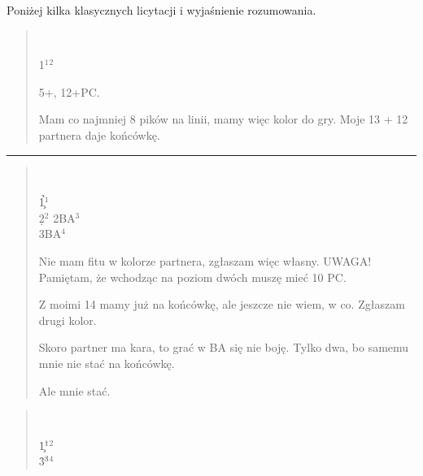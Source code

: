 \documentclass{article}
\begin{document}
Poniżej kilka klasycznych licytacji i wyjaśnienie rozumowania.
\newpage
\begin{multicols}{2}
\begin{quote}
%
           {}{}\\
\begin{pbidding}
1\s$^1$\s$^2$\\
\end{pbidding}
\begin{description}[before={\renewcommand\makelabel[1]{\bfseries ##1)}}]
	\item[1] 5+\s, 12+PC.
	\item[2] Mam co najmniej 8 pików na linii, mamy więc kolor do gry. Moje 13 + 12 partnera daje końcówkę.
\end{description}
\end{quote}
\noindent\rule{8cm}{0.4pt}
\begin{quote}
%
           {}{}\\
\begin{pbidding}
1\h{}\c$^1$\\
2\d$^2$\> 2BA$^3$\\
3BA$^4$\\
\end{pbidding}
\begin{description}[before={\renewcommand\makelabel[1]{\bfseries ##1)}}]
	\item[1] Nie mam fitu w kolorze partnera, zgłaszam więc własny. UWAGA! Pamiętam, że wchodząc na poziom dwóch muszę mieć 10 PC.
	\item[2] Z moimi 14 mamy już na końcówkę, ale jeszcze nie wiem, w co. Zgłaszam drugi kolor.
	\item[3] Skoro partner ma kara, to grać w BA się nie boję. Tylko dwa, bo samemu mnie nie stać na końcówkę.
	\item[4] Ale mnie stać.
\end{description}
\end{quote}
\vfill\null
\columnbreak
\begin{quote}
%
           {}{}\\
\begin{pbidding}
1\c$^1$\h$^2$\\
3\h$^3$\h$^4$\\
\end{pbidding}
\begin{description}[before={\renewcommand\makelabel[1]{\bfseries ##1)}}]

\end{description}
\end{quote}
\end{multicols}
\end{document}
